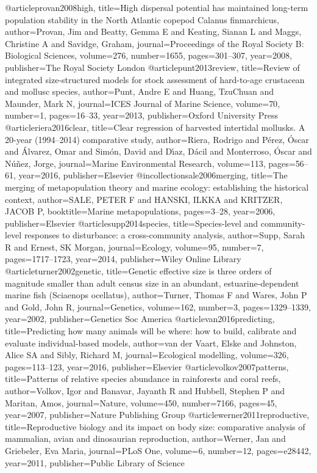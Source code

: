 @article{provan2008high,
	title={High dispersal potential has maintained long-term population stability in the North Atlantic copepod Calanus finmarchicus},
	author={Provan, Jim and Beatty, Gemma E and Keating, Sianan L and Maggs, Christine A and Savidge, Graham},
	journal={Proceedings of the Royal Society B: Biological Sciences},
	volume={276},
	number={1655},
	pages={301--307},
	year={2008},
	publisher={The Royal Society London}
}
@article{punt2013review,
	title={Review of integrated size-structured models for stock assessment of hard-to-age crustacean and mollusc species},
	author={Punt, Andre E and Huang, TzuChuan and Maunder, Mark N},
	journal={ICES Journal of Marine Science},
	volume={70},
	number={1},
	pages={16--33},
	year={2013},
	publisher={Oxford University Press}
}
@article{riera2016clear,
	title={Clear regression of harvested intertidal mollusks. A 20-year (1994--2014) comparative study},
	author={Riera, Rodrigo and P{\'e}rez, {\'O}scar and {\'A}lvarez, Omar and Sim{\'o}n, David and D{\'\i}az, D{\'a}cil and Monterroso, {\'O}scar and N{\'u}{\~n}ez, Jorge},
	journal={Marine Environmental Research},
	volume={113},
	pages={56--61},
	year={2016},
	publisher={Elsevier}
}
@incollection{sale2006merging,
	title={The merging of metapopulation theory and marine ecology: establishing the historical context},
	author={SALE, PETER F and HANSKI, ILKKA and KRITZER, JACOB P},
	booktitle={Marine metapopulations},
	pages={3--28},
	year={2006},
	publisher={Elsevier}
}
@article{supp2014species,
	title={Species-level and community-level responses to disturbance: a cross-community analysis},
	author={Supp, Sarah R and Ernest, SK Morgan},
	journal={Ecology},
	volume={95},
	number={7},
	pages={1717--1723},
	year={2014},
	publisher={Wiley Online Library}
}
@article{turner2002genetic,
	title={Genetic effective size is three orders of magnitude smaller than adult census size in an abundant, estuarine-dependent marine fish (Sciaenops ocellatus)},
	author={Turner, Thomas F and Wares, John P and Gold, John R},
	journal={Genetics},
	volume={162},
	number={3},
	pages={1329--1339},
	year={2002},
	publisher={Genetics Soc America}
}
@article{van2016predicting,
	title={Predicting how many animals will be where: how to build, calibrate and evaluate individual-based models},
	author={van der Vaart, Elske and Johnston, Alice SA and Sibly, Richard M},
	journal={Ecological modelling},
	volume={326},
	pages={113--123},
	year={2016},
	publisher={Elsevier}
}
@article{volkov2007patterns,
	title={Patterns of relative species abundance in rainforests and coral reefs},
	author={Volkov, Igor and Banavar, Jayanth R and Hubbell, Stephen P and Maritan, Amos},
	journal={Nature},
	volume={450},
	number={7166},
	pages={45},
	year={2007},
	publisher={Nature Publishing Group}
}
@article{werner2011reproductive,
	title={Reproductive biology and its impact on body size: comparative analysis of mammalian, avian and dinosaurian reproduction},
	author={Werner, Jan and Griebeler, Eva Maria},
	journal={PLoS One},
	volume={6},
	number={12},
	pages={e28442},
	year={2011},
	publisher={Public Library of Science}
}


